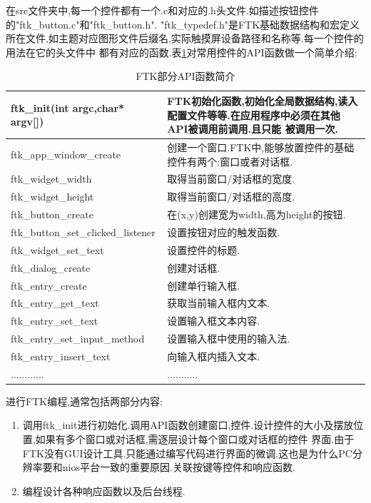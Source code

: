 \documentclass[12pt,a4paper,titlepage]{article}
\begin{document}
在src文件夹中,每一个控件都有一个.c和对应的.h头文件.如描述按钮控件的"ftk\_button.c"和"ftk\_button.h".
"ftk\_typedef.h"是FTK基础数据结构和宏定义所在文件,如主题对应图形文件后缀名,实际触摸屏设备路径和名称等.每一个控件的用法在它的头文件中
都有对应的函数.表\ref{ftk_api}对常用控件的API函数做一个简单介绍:
\begin{table}[!bhtp]
\centering
\begin{tabular}{|p{}|p{}|}
\hline
ftk\_init(int argc,char* argv[]) & FTK初始化函数,初始化全局数据结构,读入配置文件等等.在应用程序中必须在其他API被调用前调用.且只能
被调用一次.\\\hline
ftk\_app\_window\_create & 创建一个窗口.FTK中,能够放置控件的基础控件有两个:窗口或者对话框.\\\hline
ftk\_widget\_width & 取得当前窗口/对话框的宽度.\\\hline
ftk\_widget\_height & 取得当前窗口/对话框的高度.\\\hline
ftk\_button\_create & 在(x,y)创建宽为width,高为height的按钮.\\\hline
ftk\_button\_set\_clicked\_listener & 设置按钮对应的触发函数.\\\hline
ftk\_widget\_set\_text & 设置控件的标题.\\\hline
ftk\_dialog\_create & 创建对话框.\\\hline
ftk\_entry\_create & 创建单行输入框.\\\hline
ftk\_entry\_get\_text & 获取当前输入框内文本.\\\hline
ftk\_entry\_set\_text & 设置输入框文本内容.\\\hline
ftk\_entry\_set\_input\_method & 设置输入框中使用的输入法.\\\hline
ftk\_entry\_insert\_text & 向输入框内插入文本.\\\hline
............ & ...........\\\hline
\end{tabular}
\caption{FTK部分API函数简介\label{ftk_api}}
\end{table}

进行FTK编程,通常包括两部分内容:
\begin{enumerate}
\item 调用ftk\_init进行初始化.调用API函数创建窗口,控件.设计控件的大小及摆放位置,如果有多个窗口或对话框,需逐层设计每个窗口或对话框的控件
界面.由于FTK没有GUI设计工具.只能通过编写代码进行界面的微调.这也是为什么PC分辨率要和nios平台一致的重要原因.关联按键等控件和响应函数.
\item 编程设计各种响应函数以及后台线程.
\end{enumerate}
\end{document}
